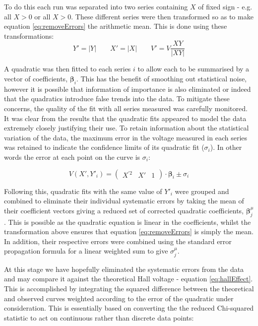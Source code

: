 \documentclass[a4paper]{article}
\begin{document}
		To do this each run was separated into two series containing $X$ of fixed sign - e.g. all $X>0$ or all $X>0$. These different series were then transformed so as to make equation \ref{eq:removeErrors} the arithmetic mean. This is done using these transformations:
		\[Y' = |Y| \qquad X' = |X| \qquad V' = V\frac{XY}{|XY|}\]
		
		A quadratic was then fitted to each series $i$ to allow each to be summarised by a vector of coefficients, $\boldsymbol{\beta}_i$. This has the benefit of smoothing out statistical noise, however it is possible that information of importance is also eliminated or indeed that the quadratics introduce false trends into the data. To mitigate these concerns, the quality of the fit with all series measured was carefully monitored. It was clear from the results that the quadratic fits appeared to model the data extremely closely justifying their use. To retain information about the statistical variation of the data, the maximum error in the voltage measured in each series was retained to indicate the confidence limits of its quadratic fit ($\sigma_i$). In other words the error at each point on the curve is $\sigma_i$:
		
		\begin{equation}
			V(X',Y'_i) = \begin{pmatrix}X^{\prime2} & X' & 1\end{pmatrix}\cdot\boldsymbol{\beta}_i \pm \sigma_i
		\end{equation}
		
		Following this, quadratic fits with the same value of $Y'_i$ were grouped and combined to eliminate their individual systematic errors by taking the mean of their coefficient vectors giving a reduced set of corrected quadratic coefficients, $\boldsymbol{\beta}^\mu_j$. This is possible as the quadratic equation is linear in the coefficients, whilst the transformation above ensures that equation \ref{eq:removeErrors} is simply the mean. In addition, their respective errors were combined using the standard error propagation formula for a linear weighted sum to give $\sigma^\mu_j$.
		
		At this stage we have hopefully eliminated the systematic errors from the data and may compare it against the theoretical Hall voltage - equation \ref{eq:hallEffect}. This is accomplished by integrating the squared difference between the theoretical and observed curves weighted according to the error of the quadratic under consideration. This is essentially based on converting the the reduced Chi-squared statistic to act on continuous rather than discrete data points:
		
\end{document}
